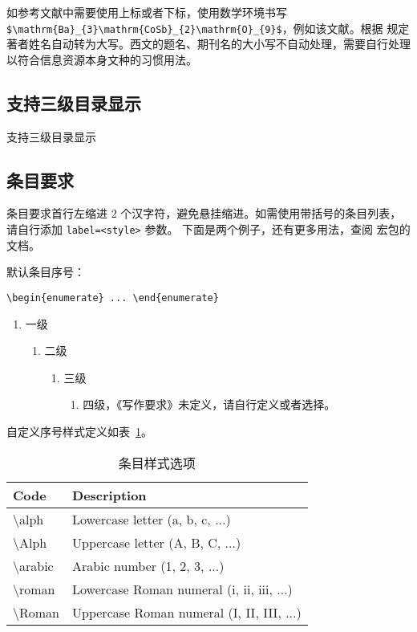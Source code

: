 如参考文献中需要使用上标或者下标，使用数学环境书写 \verb|$\mathrm{Ba}_{3}\mathrm{CoSb}_{2}\mathrm{O}_{9}$|，例如该文献\cite{kamiya2018nature}。根据  规定著者姓名自动转为大写。西文的题名、期刊名的大小写不自动处理，需要自行处理以符合信息资源本身文种的习惯用法。


\subsection{支持三级目录显示}

支持三级目录显示


\subsection{条目要求}

条目要求首行左缩进 2 个汉字符，避免悬挂缩进。如需使用带括号的条目列表，请自行添加 \verb|label=<style>| 参数。
下面是两个例子，还有更多用法，查阅  宏包的文档。

默认条目序号：

\verb|\begin{enumerate} ... \end{enumerate}|

\begin{enumerate}
  \item 一级
  \begin{enumerate}
    \item 二级
    \begin{enumerate}
      \item 三级
      \begin{enumerate}
        \item 四级，《写作要求》未定义，请自行定义或者选择。
      \end{enumerate}
    \end{enumerate}
  \end{enumerate}
\end{enumerate}

自定义序号样式定义如表~\ref{tab:enum-style}。

\begin{table}[h]
  \centering
  \caption{条目样式选项}
  \label{tab:enum-style}
  \begin{tabular}{@{}ll@{}}
  \toprule
  \textbf{Code}          & \textbf{Description}                      \\ \midrule
  \textbackslash{}alph   & Lowercase letter (a, b, c, ...)           \\
  \textbackslash{}Alph   & Uppercase letter (A, B, C, ...)           \\
  \textbackslash{}arabic & Arabic number (1, 2, 3, ...)              \\
  \textbackslash{}roman  & Lowercase Roman numeral (i, ii, iii, ...) \\
  \textbackslash{}Roman  & Uppercase Roman numeral (I, II, III, ...) \\ \bottomrule
  \end{tabular}
\end{table}

